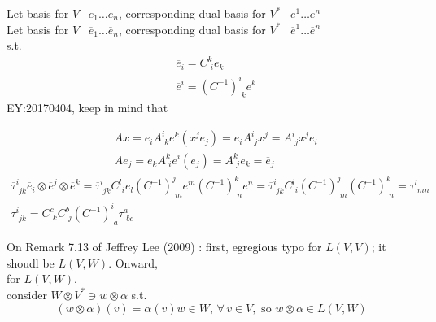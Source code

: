 \documentclass[10pt]{amsart}
\newcommand{\exercisehead}[1]
  { \smallskip
   \noindent{\small\bf Exercise #1.}
  }
\begin{document}
\begin{multicols*}{2}
\exercisehead{7.11}  Let basis for $V$ \, $e_1 \dots e_n$, corresponding dual basis for $V^*$ \,  $e^1 \dots e^n$ \\ 
Let basis for $V$ \, $\overline{e}_1 \dots \overline{e}_n$, corresponding dual basis for $V^*$ \,  $\overline{e}^1 \dots \overline{e}^n$ \\
s.t. 
\[
\begin{aligned}
	& \overline{e}_i = C^k_{ \,\, i} e_k \\
	& \overline{e}^i = (C^{-1})^i_{ \, \, k} e^k
\end{aligned}
\]
EY:20170404, keep in mind that
 
\[
\begin{aligned}
	&	Ax = e_i A^i_{ \, \, k} e^k(x^j e_j) = e_i A^i_{ \,\,j} x^j = A^i_{ \, \, j} x^j e_i \\ 
 & Ae_j = e_k A^k_{ \, \, i} e^i (e_j) = A^k_{ \,\, j} e_k = \overline{e}_j
\end{aligned}
\]
\[
\begin{gathered}
\overline{\tau}^i_{ \,\, jk} \overline{e}_i \otimes \overline{e}^j \otimes \overline{e}^k = \overline{\tau}^i_{ \, \, jk} C^l_{ \, \, i} e_l (C^{-1})^j_{ \,\, m} e^m(C^{-1})^k_{ \, \, n} e^n = \overline{\tau}^i_{ \, \, jk} C^l_{ \, \, i } (C^{-1})^j_{ \,\, m} (C^{-1})^k_{ \,\, n} = \tau^l_{ \,\, mn}   \\
\overline{\tau}^i_{ \,\, jk} = C^c_{ \,\, k} C^b_{ \,\, j} (C^{-1})^i_{ \,\, a} \tau^a_{\,\, bc}
\end{gathered}
\]



On Remark 7.13 of Jeffrey Lee (2009) \cite{JLee2009}:  first, egregious typo for $L(V,V)$; it shoudl be $L(V,W)$.  Onward, \\
for $L(V,W)$, \\
consider $W\otimes V^* \ni w\otimes \alpha$ s.t.
\[
(w\otimes \alpha)(v) = \alpha(v)w\in W, \, \forall \, v\in V, \text{ so } w\otimes \alpha \in L(V,W)
\]


\end{multicols*}
\end{document}
